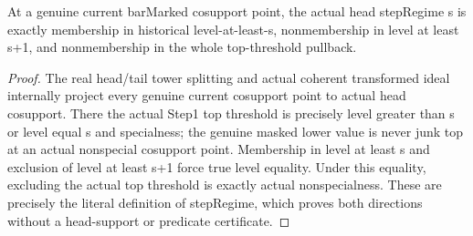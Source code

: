 \begin{lemma}
\label{hir:step-one-actual-curve-head-regime-dictionary}
\leanok
At a genuine current barMarked cosupport point, the actual head stepRegime s
is exactly membership in historical level-at-least-s, nonmembership in level
at least s+1, and nonmembership in the whole top-threshold pullback.
\end{lemma}
\begin{proof}
The real head/tail tower splitting and actual coherent transformed ideal
internally project every genuine current cosupport point to actual head
cosupport. There the actual Step1 top threshold is precisely level greater
than s or level equal s and specialness; the genuine masked lower value is
never junk top at an actual nonspecial cosupport point. Membership in level
at least s and exclusion of level at least s+1 force true level equality.
Under this equality, excluding the actual top threshold is exactly actual
nonspecialness. These are precisely the literal definition of stepRegime,
which proves both directions without a head-support or predicate certificate.
\end{proof}

